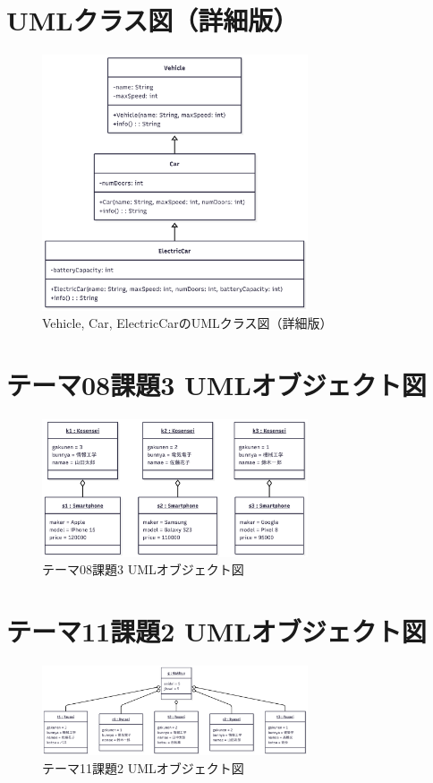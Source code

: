 \documentclass[a4paper]{article}
\begin{document}
\begin{CJK}{UTF8}{min}
\section{UMLクラス図（詳細版）}

\begin{figure}[h]
\centering
\includegraphics[width=0.7\textwidth]{b.png}
\caption{Vehicle, Car, ElectricCarのUMLクラス図（詳細版）}
\end{figure}

\newpage

\section{テーマ08課題3 UMLオブジェクト図}

\begin{figure}[h]
\centering
\includegraphics[width=0.7\textwidth]{c.png}
\caption{テーマ08課題3 UMLオブジェクト図}
\end{figure}

\section{テーマ11課題2 UMLオブジェクト図}

\begin{figure}[h]
\centering
\includegraphics[width=0.7\textwidth]{d.png}
\caption{テーマ11課題2 UMLオブジェクト図}
\end{figure}

\end{CJK}
\end{document}
